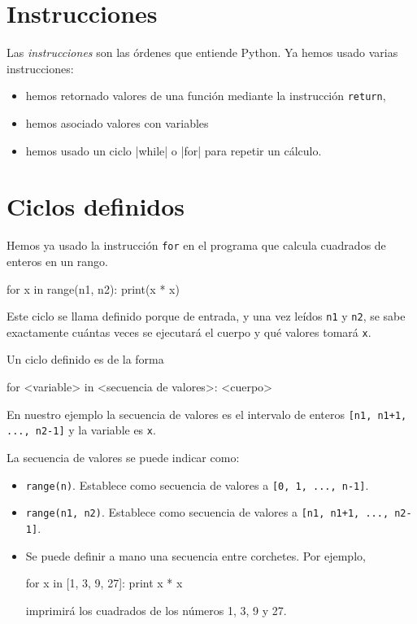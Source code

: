 \section{Instrucciones}

Las {\it instrucciones} son las órdenes que entiende Python. Ya
hemos usado varias instrucciones:

\begin{itemize}
\item hemos retornado valores de una función mediante la
instrucción \lstinline!return!,

\item hemos asociado valores con variables

\item hemos usado un ciclo |while| o |for| para repetir un cálculo.
\end{itemize}

\section{Ciclos definidos}
\label{ciclosdef}
Hemos ya usado la instrucción \lstinline!for! en el programa que calcula
cuadrados de enteros en un rango.

\begin{codigo-python-sn}
for x in range(n1, n2):
    print(x * x)
\end{codigo-python-sn}

Este ciclo se llama definido porque de entrada, y una vez leídos
\lstinline!n1! y \lstinline!n2!, se sabe exactamente cuántas veces se ejecutará
el cuerpo y qué valores tomará \lstinline!x!.

Un ciclo definido es de la forma

\begin{codigo-python-sn}
for <variable> in <secuencia de valores>:
    <cuerpo>
\end{codigo-python-sn}

En nuestro ejemplo la secuencia de valores es el intervalo de
enteros \lstinline![n1, n1+1, ..., n2-1]! y la variable es \lstinline!x!.

La secuencia de valores se puede indicar como:

\begin{itemize}
\item \lstinline!range(n)!. Establece como secuencia de valores a
 \lstinline![0, 1, ..., n-1]!.

\item \lstinline!range(n1, n2)!. Establece como secuencia de valores a
\lstinline![n1, n1+1, ..., n2-1]!.

\item Se puede definir a mano una secuencia entre corchetes. Por ejemplo,

\begin{codigo-python-sn}
for x in [1, 3, 9, 27]:
    print x * x
\end{codigo-python-sn}

imprimirá los cuadrados de los números 1, 3, 9 y 27.

\end{itemize}

